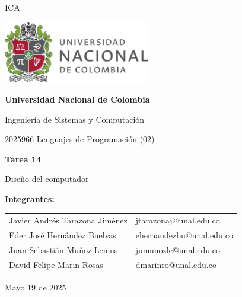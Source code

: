 ICA\documentclass{article}
\begin{document}
\begin{titlepage}
  \centering
  \includegraphics[width=0.48\textwidth]{logo_universidad.png}
  \par\vspace{2cm}

  {\Large \textbf{Universidad Nacional de Colombia} \par}
  \vspace{0.5cm}
  {\large Ingeniería de Sistemas y Computación \par}
  {\large 2025966 Lenguajes de Programación (02)\par}
  \vspace{3cm}

  {\large \textbf{Tarea 14} \par}
  {\large Diseño del computador\par}
  \vspace{3cm}

  {\large \textbf{Integrantes:} \par}
  \vspace{0.5cm}
  \begin{tabular}{ll}
    Javier Andrés Tarazona Jiménez & jtarazonaj@unal.edu.co \\
    Eder  José Hernández Buelvas   & ehernandezbu@unal.edu.co \\
    Juan Sebastián Muñoz Lemus     & jumunozle@unal.edu.co          \\
    David Felipe Marin Rosas       & dmarinro@unal.edu.co   \\
  \end{tabular}
  \par\vspace{3cm}

  {\large Mayo 19 de 2025 \par}
\end{titlepage}

\tableofcontents %

\newpage %
\end{document}
